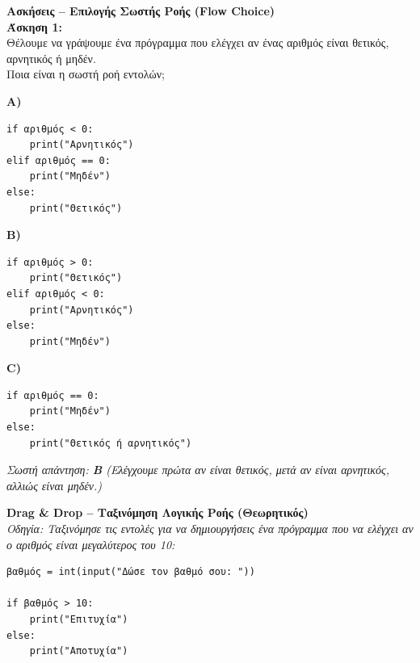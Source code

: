 \documentclass[11pt]{report}
\begin{document}
\vspace{1em}
\textbf{Ασκήσεις – Επιλογής Σωστής Ροής (Flow Choice)} \\[0.5em]
\textbf{Άσκηση 1:} \\
Θέλουμε να γράψουμε ένα πρόγραμμα που ελέγχει αν ένας αριθμός είναι θετικός, αρνητικός ή μηδέν.\\
Ποια είναι η σωστή ροή εντολών;

\textbf{A)}
\begin{tcolorbox}[colback=gray!5!white, colframe=black!75!black]
\begin{verbatim}
if αριθμός < 0:
    print("Αρνητικός")
elif αριθμός == 0:
    print("Μηδέν")
else:
    print("Θετικός")
\end{verbatim}
\end{tcolorbox}

\textbf{B)}
\begin{tcolorbox}[colback=gray!5!white, colframe=black!75!black]
\begin{verbatim}
if αριθμός > 0:
    print("Θετικός")
elif αριθμός < 0:
    print("Αρνητικός")
else:
    print("Μηδέν")
\end{verbatim}
\end{tcolorbox}

\textbf{C)}
\begin{tcolorbox}[colback=gray!5!white, colframe=black!75!black]
\begin{verbatim}
if αριθμός == 0:
    print("Μηδέν")
else:
    print("Θετικός ή αρνητικός")
\end{verbatim}
\end{tcolorbox}

\textit{Σωστή απάντηση: \textbf{B} (Ελέγχουμε πρώτα αν είναι θετικός, μετά αν είναι αρνητικός, αλλιώς είναι μηδέν.)}

\vspace{1em}
\textbf{Drag \& Drop – Ταξινόμηση Λογικής Ροής (Θεωρητικός)} \\[0.5em]
\textit{Οδηγία: Ταξινόμησε τις εντολές για να δημιουργήσεις ένα πρόγραμμα που να ελέγχει αν ο αριθμός είναι μεγαλύτερος του 10:}

\begin{tcolorbox}[colback=gray!5!white, colframe=black!75!black]
\begin{verbatim}
βαθμός = int(input("Δώσε τον βαθμό σου: "))

if βαθμός > 10:
    print("Επιτυχία")
else:
    print("Αποτυχία")
\end{verbatim}
\end{tcolorbox}
\end{document}
